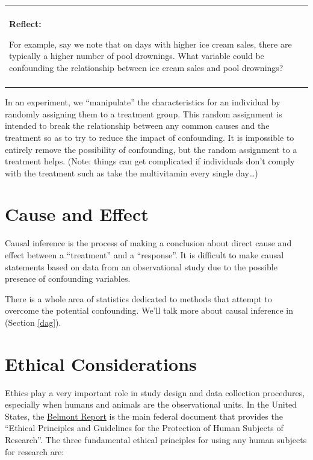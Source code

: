 \documentclass[
]{book}
\newenvironment{reflect}
{
    \begin{center}
    
    \begin{tabular}{|p{0.8\textwidth}|}
    \rowcolor{LightBlue}
    \hline\\
    \rowcolor{LightBlue}
    \textbf{Reflect:}
}
{
    \\\rowcolor{LightBlue}
    \\\hline
    \end{tabular} 
    \end{center}
}
\begin{document}
\begin{reflect}
For example, say we note that on days with higher ice cream sales, there
are typically a higher number of pool drownings. What variable could be
confounding the relationship between ice cream sales and pool drownings?
\end{reflect}

In an experiment, we ``manipulate'' the characteristics for an individual by randomly assigning them to a treatment group. This random assignment is intended to break the relationship between any common causes and the treatment so as to try to reduce the impact of confounding. It is impossible to entirely remove the possibility of confounding, but the random assignment to a treatment helps. (Note: things can get complicated if individuals don't comply with the treatment such as take the multivitamin every single day\ldots)

\section{Cause and Effect}\label{cause-and-effect}

Causal inference is the process of making a conclusion about direct cause and effect between a ``treatment'' and a ``response''. It is difficult to make causal statements based on data from an observational study due to the possible presence of confounding variables.

There is a whole area of statistics dedicated to methods that attempt to overcome the potential confounding. We'll talk more about causal inference in (Section \ref{dag}).

\section{Ethical Considerations}\label{ethical-considerations}

Ethics play a very important role in study design and data collection procedures, especially when humans and animals are the observational units. In the United States, the \href{https://www.hhs.gov/ohrp/regulations-and-policy/belmont-report/index.html}{Belmont Report} is the main federal document that provides the ``Ethical Principles and Guidelines for the Protection of Human Subjects of Research''. The three fundamental ethical principles for using any human subjects for research are:
\end{document}
